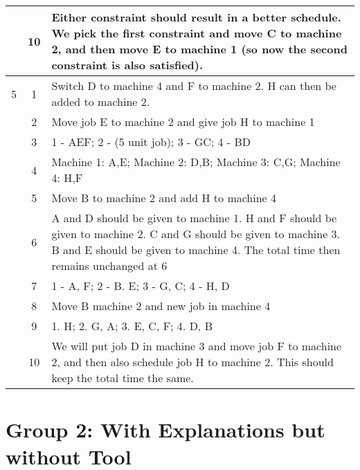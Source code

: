 \begin{tabularx}{\linewidth}{c c X}
	& 10 & Either constraint should result in a better schedule. We pick the first constraint and move C to machine 2, and then move E to machine 1 (so now the second constraint is also satisfied). \\
	\hline
	5 & 1 & Switch D to machine 4 and F to machine 2. H can then be added to machine 2. \\
	& 2 & Move job E to machine 2 and give job H to machine 1 \\
	& 3 & 1 - AEF; 2 - (5 unit job); 3 - GC; 4 - BD \\
	& 4 & Machine 1: A,E; Machine 2: D,B; Machine 3: C,G; Machine 4: H,F \\
	& 5 & Move B to machine 2 and add H to machine 4 \\
	& 6 & A and D should be given to machine 1. H and F should be given to machine 2. C and G should be given to machine 3. B and E should be given to machine 4. The total time then remains unchanged at 6 \\
	& 7 & 1 - A, F; 2 - B. E; 3 - G, C; 4 - H, D \\
	& 8 & Move B machine 2 and new job in machine 4 \\
	& 9 & 1. H; 2. G, A; 3. E, C, F; 4. D, B \\
	& 10 & We will put job D in machine 3 and move job F to machine 2, and then also schedule job H to machine 2. This should keep the total time the same. \\
\end{tabularx}

\section{Group 2: With Explanations but without Tool}
\label{group2data}


